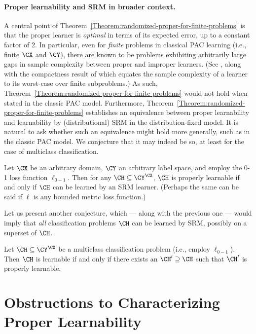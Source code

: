 \documentclass[11pt]{article}
\begin{document}
\paragraph{Proper learnability and SRM in broader context.} A central point of Theorem~\ref{Theorem:randomized-proper-for-finite-problems} is that the proper learner is \emph{optimal} in terms of its expected error, up to a constant factor of 2. In particular, even for \emph{finite} problems in classical PAC learning (i.e., finite $\CX$ and $\CY$), there are known to be problems exhibiting arbitrarily large gaps in sample complexity between proper and improper learners. (See \citet[Theorem 1]{DS14}, along with the compactness result of \cite{asilis2024transductive} which equates the sample complexity of a learner to its worst-case over finite subproblems.) As such, Theorem~\ref{Theorem:randomized-proper-for-finite-problems} would not hold when stated in the classic PAC model. Furthermore, Theorem~\ref{Theorem:randomized-proper-for-finite-problems} establishes an equivalence between proper learnability and learnability by (distributional) SRM in the distribution-fixed model. It is natural to ask whether such an equivalence might hold more generally, such as in the classic PAC model. We conjecture that it may indeed be so, at least for the case of multiclass classification. 

\begin{conjecture}
Let $\CX$ be an arbitrary domain, $\CY$ an arbitrary label space, and employ the 0-1 loss function $\ell_{0-1}$. Then for any $\CH \subseteq \CY^\CX$, $\CH$ is properly learnable if and only if $\CH$ can be learned by an SRM learner. (Perhaps the same can be said if $\ell$ is any bounded metric loss function.)
\end{conjecture}

Let us present another conjecture, which --- along with the previous one --- would imply that \emph{all} classification problems $\CH$ can be learned by SRM, possibly on a superset of $\CH$. 

\begin{conjecture}
Let $\CH \subseteq \CY^\CX$ be a multiclass classification problem (i.e., employ $\ell_{0-1}$). Then $\CH$ is learnable if and only if there exists an $\CH' \supseteq \CH$ such that $\CH'$ is properly learnable. 
\end{conjecture}

\section{Obstructions to Characterizing Proper Learnability}\label{Section:obstructions-proper-learnability}
\end{document}
